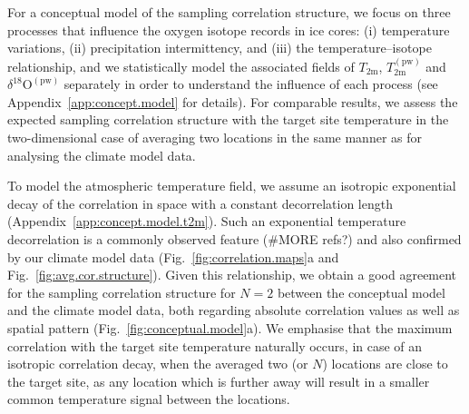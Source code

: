 \documentclass[cp, manuscript]{copernicus}
\begin{document}
For a conceptual model of the sampling correlation structure, we focus on three
processes that influence the oxygen isotope records in ice cores: (i)
temperature variations, (ii) precipitation intermittency, and (iii) the
temperature--isotope relationship, and we statistically model the associated
fields of $T_{\mathrm{2m}}$, $T_{2\mathrm{m}}^{\mathrm{(pw)}}$ and
$\delta^{18}\mathrm{O}^{\mathrm{(pw)}}$ separately in order to understand the
influence of each process (see Appendix~\ref{app:concept.model} for details).
For comparable results, we assess the expected sampling correlation structure
with the target site temperature in the two-dimensional case of averaging two
locations in the same manner as for analysing the climate model data.

To model the atmospheric temperature field, we assume an isotropic exponential
decay of the correlation in space with a constant decorrelation length
(Appendix~\ref{app:concept.model.t2m}). Such an exponential temperature
decorrelation is a commonly observed feature \citep{Jones1997} (\#MORE refs?)
and also confirmed by our climate model data (Fig.~\ref{fig:correlation.maps}a
and Fig.~\ref{fig:avg.cor.structure}). Given this relationship, we obtain a good
agreement for the sampling correlation structure for $N=2$ between the
conceptual model and the climate model data, both regarding absolute correlation
values as well as spatial pattern (Fig.~\ref{fig:conceptual.model}a). We
emphasise that the maximum correlation with the target site temperature
naturally occurs, in case of an isotropic correlation decay, when the averaged
two (or $N$) locations are close to the target site, as any location which is
further away will result in a smaller common temperature signal between the
locations.
\end{document}
